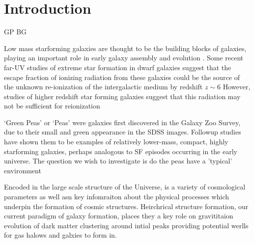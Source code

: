 \documentclass[12pt]{article}
\begin{document}



\begin{abstract}
\end{abstract}


\section{Introduction}
\label{sec:intro}

GP BG
 
Low mass starforming galaxies are thought to be the building blocks of galaxies, playing an important role in early galaxy assembly and evolution \citep{Pillepich2015}.
Some recent far-UV studies of extreme star formation in dwarf galaxies suggest that the escape fraction of ionizing radiation from these galaxies could be the source of the unknown re-ionization of the intergalactic medium by redshift $z\sim6$ \citep{erb2016,Izotovetal2016}
However, studies of higher redshift star forming galaxies suggest that this radiation may not be sufficient for reionization \citep{Rutkowski2017,Grazian2017, Rutkowski2016}

`Green Peas' or `Peas' were galaxies first discovered in the Galaxy Zoo Survey, due to their small and green appearance in the SDSS images.
Followup studies have shown them to be examples of relatively lower-mass, compact, highly starforming galaxies, perhaps analogous to SF episodes occurring in the early universe.
The question we wish to investigate is do the peas have a 'typical' environment

Encoded in the large scale structure of the Universe, is a variety of cosmological parameters as well asn key infomraiton about the physical processes which underpin the formation of cosmic structures.
Heirchrical structure formation, our current paradigm of galaxy formation, places they a key role on gravititaion evolution of dark matter clustering around intial peaks providing potential werlls for gas halows and galxies to form in.
\end{document}
